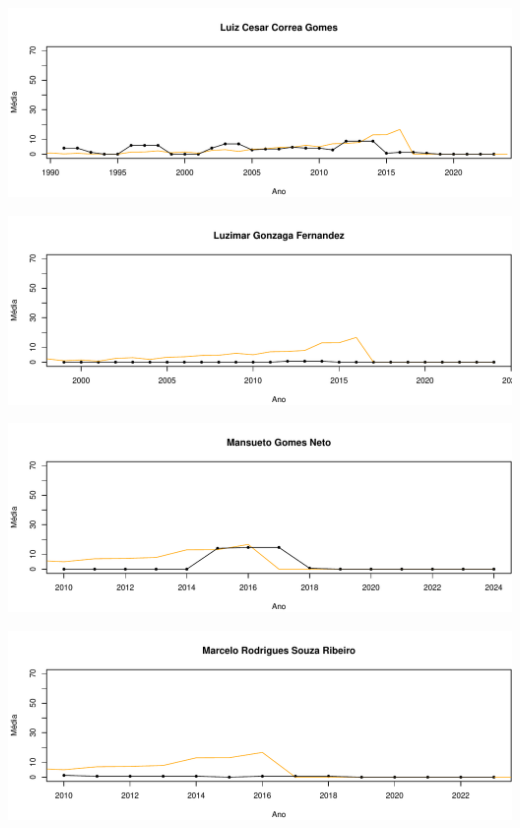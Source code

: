 \documentclass[12pt,brazil]{article}\usepackage[]{graphicx}\usepackage[]{xcolor}
\makeatletter
\def\maxwidth{ %
  \ifdim\Gin@nat@width>\linewidth
    \linewidth
  \else
    \Gin@nat@width
  \fi
}
\makeatother
\begin{document}
\vspace{0.5cm}


{\centering \includegraphics[width=\maxwidth]{figure/mediamovel-43} 

}



\vspace{0.5cm}


{\centering \includegraphics[width=\maxwidth]{figure/mediamovel-44} 

}



\vspace{0.5cm}


{\centering \includegraphics[width=\maxwidth]{figure/mediamovel-45} 

}



\vspace{0.5cm}


{\centering \includegraphics[width=\maxwidth]{figure/mediamovel-46} 

}
\end{document}
